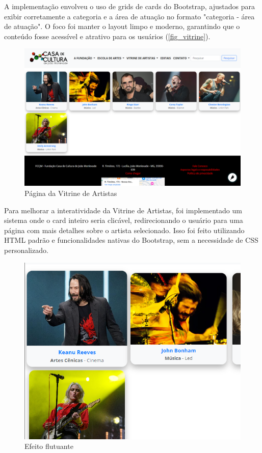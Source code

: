A implementação envolveu o uso de grids de cards do Bootstrap, ajustados para exibir corretamente a categoria e a área de atuação no formato "categoria - área de atuação". O foco foi manter o layout limpo e moderno, garantindo que o conteúdo fosse acessível e atrativo para os usuários (\autoref{fig_vitrine}).

\begin{figure}[htb]
	\caption{\label{fig_vitrine}Página da Vitrine de Artistas}
	\begin{center}
	    \includegraphics[scale=0.3]{./img/vitrine_de_artistas.png}
	\end{center}
\end{figure}

Para melhorar a interatividade da Vitrine de Artistas, foi implementado um sistema onde o card inteiro seria clicável, redirecionando o usuário para uma página com mais detalhes sobre o artista selecionado. Isso foi feito utilizando \ac{HTML} padrão e funcionalidades nativas do Bootstrap, sem a necessidade de \ac{CSS} personalizado.


\begin{figure}[htb]
	\caption{\label{fig_grafico}Efeito flutuante}
	\begin{center}
	    \includegraphics[scale=0.35]{./img/vitrine_de_artistas_hover.png}
	\end{center}
\end{figure}

